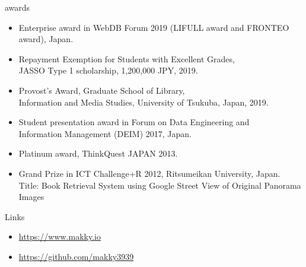 \documentclass{resume} %
\begin{document}
\begin{rSection}{awards}
\begin{itemize}
  \item Enterprise award in WebDB Forum 2019 (LIFULL award and FRONTEO award), Japan.
  \item Repayment Exemption for Students with Excellent Grades, \\JASSO Type 1 scholarship, 1,200,000 JPY, 2019.
  \item Provost’s Award, Graduate School of Library, \\Information and Media Studies, University of Tsukuba, Japan, 2019.
  \item Student presentation award in Forum on Data Engineering
  and \\Information Management (DEIM) 2017, Japan.
  \item Platinum award, ThinkQuest JAPAN 2013. %
  \item Grand Prize in ICT Challenge+R 2012, Ritsumeikan University, Japan. \\Title: Book Retrieval System using Google Street View of Original Panorama Images
\end{itemize}

\end{rSection}


\begin{rSection}{Links}
\begin{itemize}
  \item \url{https://www.makky.io}
  \item \url{https://github.com/makky3939}
\end{itemize}
\end{rSection}
\end{document}
